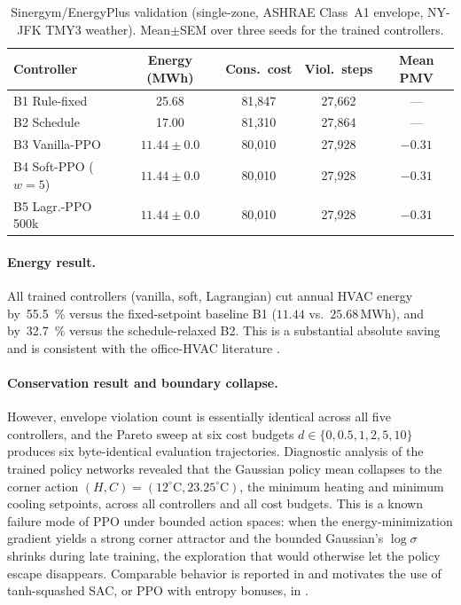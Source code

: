 \documentclass[11pt,a4paper]{article}
\begin{document}
\begin{table}[t]
\centering
\caption{Sinergym/EnergyPlus validation (single-zone, ASHRAE Class~A1
envelope, NY-JFK TMY3 weather). Mean$\pm$SEM over three seeds for the
trained controllers.}
\label{tab:sinergym}
\small
\setlength{\tabcolsep}{4pt}
\begin{tabular}{lcccc}
\toprule
Controller & Energy (MWh) & Cons.\ cost & Viol.\ steps & Mean PMV \\
\midrule
B1 Rule-fixed           & 25.68   & 81{,}847   & 27{,}662 & --- \\
B2 Schedule             & 17.00   & 81{,}310   & 27{,}864 & --- \\
B3 Vanilla-PPO          & $11.44\pm0.0$ & 80{,}010 & 27{,}928 & $-0.31$ \\
B4 Soft-PPO ($w=5$)     & $11.44\pm0.0$ & 80{,}010 & 27{,}928 & $-0.31$ \\
B5 Lagr.-PPO 500k       & $11.44\pm0.0$ & 80{,}010 & 27{,}928 & $-0.31$ \\
\bottomrule
\end{tabular}
\end{table}

\paragraph{Energy result.}
All trained controllers (vanilla, soft, Lagrangian) cut annual HVAC
energy by~\SI{55.5}{\percent} versus the fixed-setpoint baseline B1
($11.44$ vs.\ $25.68$\,MWh), and by~\SI{32.7}{\percent} versus the
schedule-relaxed B2. This is a substantial absolute saving and is
consistent with the office-HVAC literature
\citep{brandi2022online,efficient_assured_2025,drl_g36_2025}.

\paragraph{Conservation result and boundary collapse.}
However, envelope violation count is essentially identical across all
five controllers, and the Pareto sweep at six cost budgets
$d\in\{0,0.5,1,2,5,10\}$ produces six byte-identical evaluation
trajectories. Diagnostic analysis of the trained policy networks
revealed that the Gaussian policy mean collapses to the corner action
$(H,C)=(12^\circ\mathrm{C},23.25^\circ\mathrm{C})$, the minimum
heating and minimum cooling setpoints, across all controllers and all
cost budgets. This is a known failure mode of PPO under bounded
action spaces: when the energy-minimization gradient yields a strong
corner attractor and the bounded Gaussian's $\log\sigma$ shrinks
during late training, the exploration that would otherwise let the
policy escape disappears. Comparable behavior is reported in
\citet{manjavacas2024sinergym} and motivates the use of tanh-squashed
SAC, or PPO with entropy bonuses, in \citet{efficient_assured_2025}.
\end{document}
